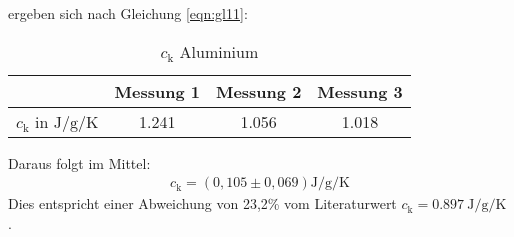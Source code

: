 \FloatBarrier
\noindent
ergeben sich nach Gleichung \eqref{eqn:gl11}:
\begin{table}
  \centering
  \caption{$c_\text{k}$ Aluminium}
  \label{tab:ckAlu}
  \begin{tabular}{c c c c}
   \toprule
   & Messung 1 & Messung 2 & Messung 3 \\
   \midrule
   $c_\text{k}$ in $\si{\joule\per\gram\per\kelvin}$ & 1.241 & 1.056 & 1.018 \\
   \bottomrule
  \end{tabular}
\end{table}
\FloatBarrier
\noindent
Daraus folgt im Mittel:
\begin{align*}
  c_\text{k} = \left(0,105 \pm 0,069 \right) \si{\joule\per\gram\per\kelvin}
\end{align*}
Dies entspricht einer Abweichung von 23,2\% vom Literaturwert $c_\text{k} = \SI{0,897}{\joule\per\gram\per\kelvin}$ \cite{Wkappa}.

